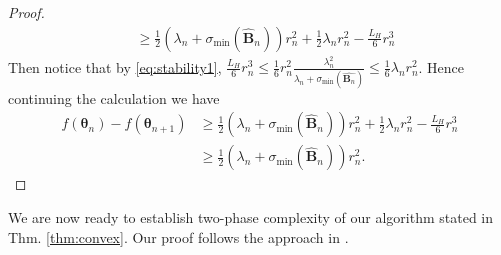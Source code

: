 \documentclass[11pt]{amsart}
\theoremstyle{plain}
\theoremstyle{definition}
\theoremstyle{remark}
\def\B{\mathbf{B}}
\def\param{\boldsymbol{\theta}}
\newcommand{\commHL}[1]{{\textcolor{blue}{#1}}}
\begin{document}
\begin{proof}
\begin{align*}
		&\geq 
        \frac{1}{2}(\lambda_n+\sigma_{\min}({\hat{\B}_{n}})) r_n^2+ 
       \frac{1}{2}\lambda_n r_n^2-\frac{L_H}{6}r_n^3 
	\end{align*}
    Then notice that by \eqref{eq:stability1}, $\frac{L_H}{6}r_n^3\leq \frac{1}{6}r_n^2\frac{\lambda_n^2}{\lambda_n+\sigma_{\min}(\hat{\B_n})}\leq\frac{1}{6}\lambda_nr_n^2$. 
    Hence  continuing the calculation we have
	\begin{align*}
	f(\param_n)-f(\param_{n+1}) &\geq 
        \frac{1}{2}(\lambda_n+\sigma_{\min}({\hat{\B}_{n}})) r_n^2+ 
       \frac{1}{2}\lambda_n r_n^2-\frac{L_H}{6}r_n^3\\
       &\geq \frac{1}{2}(\lambda_n+\sigma_{\min}({\hat{\B}_{n}})) r_n^2.
	\end{align*}
\end{proof}

We are now ready to establish two-phase complexity of our algorithm stated in Thm. \ref{thm:convex}. Our proof follows the approach in \cite{mishchenko2023regularized}. 
\end{document}
